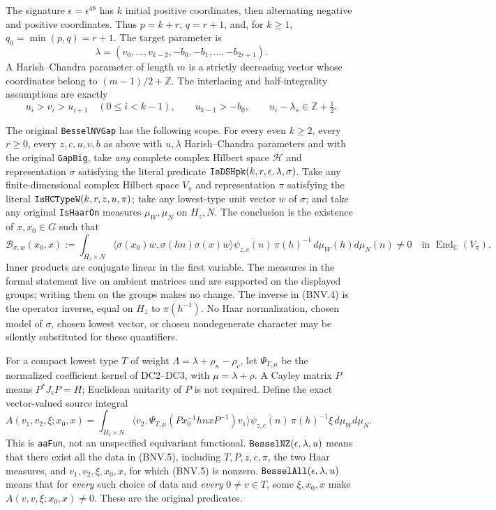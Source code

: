 \documentclass[11pt,a4paper]{article}
\numberwithin{equation}{section}
\theoremstyle{remark}\newtheorem{remark}[theorem]{Remark}
\begin{document}
The signature $\epsilon=\epsilon^{48}$ has $k$ initial positive coordinates,
then alternating negative and positive coordinates.  Thus
$p=k+r$, $q=r+1$, and, for $k\ge1$, $q_0=\min(p,q)=r+1$.
The target parameter is
\[
 \lambda=(v_0,\ldots,v_{k-2},-b_0,-b_1,\ldots,-b_{2r+1}).
 \tag{BNV.2}
\]
A Harish--Chandra parameter of length $m$ is a strictly decreasing vector
whose coordinates belong to $(m-1)/2+\mathbb Z$.  The interlacing and
half-integrality assumptions are exactly
\[
 u_i>v_i>u_{i+1}\quad(0\le i<k-1),\qquad u_{k-1}>-b_0,
 \qquad u_i-\lambda_s\in\mathbb Z+\tfrac12.
 \tag{BNV.3}
\]

The original \texttt{Bessel\allowbreak NVGap} has the following scope.  For every even
$k\ge2$, every $r\ge0$, every $z,c,u,v,b$ as above with $u,\lambda$
Harish--Chandra parameters and with the original \texttt{Gap\allowbreak Big}, take
\emph{any} complete complex Hilbert space $\mathcal H$ and representation
$\sigma$ satisfying the literal predicate
$\texttt{Is\allowbreak DSHpk}(k,r,\epsilon,\lambda,\sigma)$.  Take any finite-dimensional
complex Hilbert space $V_\pi$ and representation $\pi$ satisfying the literal
$\texttt{Is\allowbreak HCType\allowbreak W}(k,r,z,u,\pi)$; take any lowest-type unit vector $w$ of
$\sigma$; and take any original \texttt{Is\allowbreak Haar\allowbreak On} measures $\mu_W,\mu_N$ on
$H_z,N$.  The conclusion is the existence of $x,x_0\in G$ such that
\[
 \mathcal B_{\sigma,w}(x_0,x):=
 \int_{H_z\times N}
 \langle\sigma(x_0)w,\sigma(hn)\sigma(x)w\rangle
 \overline{\psi_{z,c}(n)}\,\pi(h)^{-1}\,d\mu_W(h)d\mu_N(n)
 \ne0
 \quad\text{in }\operatorname{End}_{\mathbb C}(V_\pi).
 \tag{BNV.4}
\]
Inner products are conjugate linear in the first variable.  The measures in
the formal statement live on ambient matrices and are supported on the
displayed groups; writing them on the groups makes no change.  The inverse
in (BNV.4) is the operator inverse, equal on $H_z$ to $\pi(h^{-1})$.
No Haar normalization, chosen model of $\sigma$, chosen lowest vector, or
chosen nondegenerate character may be silently substituted for these
quantifiers.

For a compact lowest type $T$ of weight
$\Lambda=\lambda+\rho_n-\rho_c$, let $\Psi_{T,\mu}$ be the normalized
coefficient kernel of DC2--DC3, with $\mu=\lambda+\rho$.  A Cayley matrix
$P$ means $P^*J_\epsilon P=H$; Euclidean unitarity of $P$ is not required.
Define the exact vector-valued source integral
\[
 A(v_1,v_2,\xi;x_0,x)=
 \int_{H_z\times N}
 \langle v_2,\Psi_{T,\mu}(Px_0^{-1}hnxP^{-1})v_1\rangle
 \overline{\psi_{z,c}(n)}\,\pi(h)^{-1}\xi\,d\mu_Wd\mu_N.
 \tag{BNV.5}
\]
This is \texttt{aa\allowbreak Fun}, not an unspecified equivariant functional.
$\texttt{Bessel\allowbreak NZ}(\epsilon,\lambda,u)$ means that there exist all the data
in (BNV.5), including $T,P,z,c,\pi$, the two Haar measures, and
$v_1,v_2,\xi,x_0,x$, for which (BNV.5) is nonzero.
$\texttt{Bessel\allowbreak All}(\epsilon,\lambda,u)$ means that for \emph{every} such
choice of data and \emph{every} $0\ne v\in T$, some $\xi,x_0,x$ make
$A(v,v,\xi;x_0,x)\ne0$.  These are the original predicates.
\end{document}
